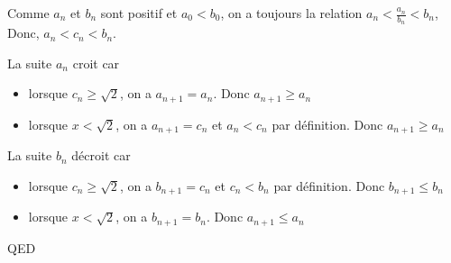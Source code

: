 \documentclass[]{book}
\theoremstyle{definition}
\begin{document}
Comme $a_n$ et $b_n$ sont positif et $a_0 < b_0$, on a toujours la relation $a_n < \frac{a_n}{b_n} < b_n$, Donc, $a_n < c_n < b_n$.
 
La suite $a_n$ croit car 
\begin{itemize}
\item lorsque $c_n \ge \sqrt{2}$, on a $a_{n+1} = a_n$. Donc $a_{n+1} \ge a_{n}$
\item lorsque $x < \sqrt{2}$, on a $a_{n+1} = c_n$ et $a_n < c_n$ par d\'efinition. Donc $a_{n+1} \ge a_{n}$   
\end{itemize}

La suite $b_n$ d\'ecroit car 
\begin{itemize}
\item lorsque $c_n \ge \sqrt{2}$, on a $b_{n+1} = c_n$ et $c_n < b_n$ par d\'efinition. Donc $b_{n+1} \le b_{n}$
\item lorsque $x < \sqrt{2}$, on a $b_{n+1} = b_n$. Donc $a_{n+1} \le a_{n}$   
\end{itemize}


QED
\end{document}
